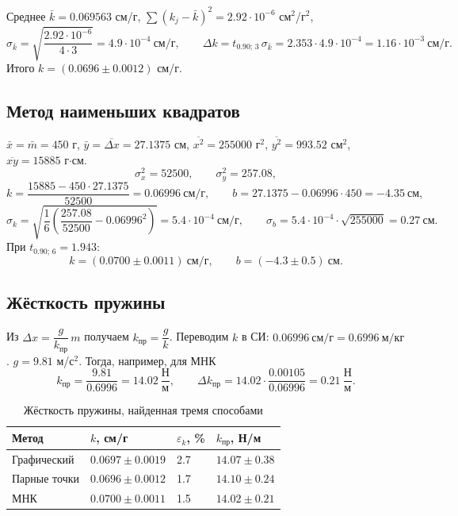 \documentclass[12pt]{article}
\begin{document}
    Среднее $\bar k = 0.069563$ см/г, $\sum (k_j - \bar k)^2 = 2.92 \cdot 10^{-6}$ см$^2$/г$^2$,
    \[
    	\sigma_{\bar k} = \sqrt{\frac{2.92 \cdot 10^{-6}}{4 \cdot 3}} = 4.9 \cdot 10^{-4} \ \text{см/г}, \qquad
    	\varDelta k = t_{0.90;\,3}\,\sigma_{\bar k} = 2.353 \cdot 4.9 \cdot 10^{-4} = 1.16 \cdot 10^{-3} \ \text{см/г}.
    \]
    Итого $k = (0.0696 \pm 0.0012)$ см/г.

    \subsection{Метод наименьших квадратов}

    $\bar x = \bar m = 450$ г, $\bar y = \overline{\varDelta x} = 27.1375$ см, $\overline{x^2} = 255000$ г$^2$, $\overline{y^2} = 993.52$ см$^2$, $\overline{xy} = 15885$ г$\cdot$см.
    \[
    	\sigma_x^2 = 52500, \qquad \sigma_y^2 = 257.08,
    \]
    \[
    	k = \frac{15885 - 450 \cdot 27.1375}{52500} = 0.06996 \ \text{см/г}, \qquad
    	b = 27.1375 - 0.06996 \cdot 450 = -4.35 \ \text{см},
    \]
    \[
    	\sigma_k = \sqrt{\frac{1}{6}\left(\frac{257.08}{52500} - 0.06996^2\right)} = 5.4 \cdot 10^{-4} \ \text{см/г}, \qquad
    	\sigma_b = 5.4 \cdot 10^{-4} \cdot \sqrt{255000} = 0.27 \ \text{см}.
    \]
    При $t_{0.90;\,6} = 1.943$:
    \[
    	k = (0.0700 \pm 0.0011) \ \text{см/г}, \qquad b = (-4.3 \pm 0.5) \ \text{см}.
    \]

    \subsection{Жёсткость пружины}

    Из $\varDelta x = \dfrac{g}{k_{\text{пр}}}\,m$ получаем $k_{\text{пр}} = \dfrac{g}{k}$. Переводим $k$ в СИ: $0.06996 \ \text{см/г} = 0.6996 \ \text{м/кг}$. $g = 9.81$ м/с$^2$. Тогда, например, для МНК
    \[
    	k_{\text{пр}} = \frac{9.81}{0.6996} = 14.02 \ \frac{\text{Н}}{\text{м}}, \qquad
    	\varDelta k_{\text{пр}} = 14.02 \cdot \frac{0.00105}{0.06996} = 0.21 \ \frac{\text{Н}}{\text{м}}.
    \]

    \begin{table}[H]
        \centering
        \begin{xltabular}{\textwidth}{@{}XXXX@{}}
            \toprule
            Метод & $k$, см/г & $\varepsilon_k$, \% & $k_{\text{пр}}$, Н/м\\
            \midrule
            Графический  & $0.0697 \pm 0.0019$ & 2.7 & $14.07 \pm 0.38$ \\
            Парные точки & $0.0696 \pm 0.0012$ & 1.7 & $14.10 \pm 0.24$ \\
            МНК          & $0.0700 \pm 0.0011$ & 1.5 & $14.02 \pm 0.21$ \\
            \bottomrule
        \end{xltabular}
        \caption{Жёсткость пружины, найденная тремя способами}
        \label{tab:k}
    \end{table}
\end{document}
